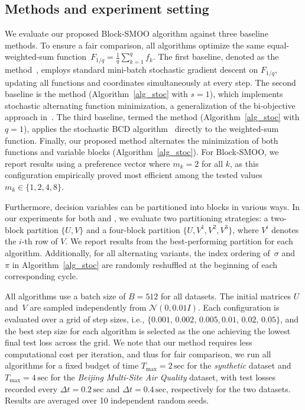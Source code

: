 \documentclass[11pt,a4paper]{article}
\numberwithin{equation}{section}%
\renewcommand{\(}{\left (}
\renewcommand{\)}{\right )}
\begin{document}
\subsection{Methods and experiment setting}

We evaluate our proposed Block-SMOO algorithm against three baseline methods. To ensure a fair comparison, all algorithms optimize the same equal-weighted-sum function~$F_{1/q} = \frac{1}{q} \sum_{k=1}^q f_k$. The first baseline, denoted as the  method~\cite{SGass_TSaaty_1955}, employs standard mini-batch stochastic gradient descent on $F_{1/q}$, updating all functions and coordinates simultaneously at every step. The second baseline is the  method (Algorithm~\ref{alg_stoc} with $s=1$), which implements stochastic alternating function minimization, a generalization of the bi-objective approach in~\cite{SLiu_LNVicente_2019}. The third baseline, termed the  method (Algorithm~\ref{alg_stoc} with $q=1$), applies the stochastic BCD algorithm~\cite{xu2015blockstochasticgradientiteration} directly to the weighted-sum function. Finally, our proposed  method alternates the minimization of both functions and variable blocks (Algorithm~\ref{alg_stoc}). For Block-SMOO, we report results using a preference vector where $m_k = 2$ for all $k$, as this configuration empirically proved most efficient among the tested values $m_k \in \{1, 2, 4, 8\}$.

Furthermore, decision variables can be partitioned into blocks in various ways. In our experiments for both  and , we evaluate two partitioning strategies: a two-block partition $\{U, V\}$ and a four-block partition $\{U, V^{1}, V^{2}, V^{3}\}$, where $V^{i}$ denotes the $i$-th row of $V$. We report results from the best-performing partition for each algorithm. Additionally, for all alternating variants, the index ordering of~$\sigma$ and~$\pi$ in Algorithm~\ref{alg_stoc} are randomly reshuffled at the beginning of each corresponding cycle.

All algorithms use a batch size of %
$B = 512$ for all %
datasets. The initial matrices $U$ and~$V$ are sampled independently from $\mathcal{N}(0, 0.01I)$.
Each configuration is evaluated over a grid of step sizes, i.e., $\{0.001,\, 0.002,\, 0.005, 0.01,\, 0.02,\, 0.05\}$,
and the best step size for each algorithm is selected as the one achieving the lowest final test loss across the grid.
We note that our method requires less computational cost per iteration, and thus for fair comparison, we run 
all algorithms for a fixed budget of time $T_{\max} = 2\,\mathrm{sec}$ for the \textit{synthetic} dataset and $T_{\max} = 4\,\mathrm{sec}$ for the \textit{Beijing Multi-Site Air Quality} dataset, with test losses recorded every $\Delta t = 0.2\,\mathrm{sec}$ and $\Delta t = 0.4\,\mathrm{sec}$, respectively for the two datasets. Results are averaged over 10 independent random seeds. 
\end{document}
